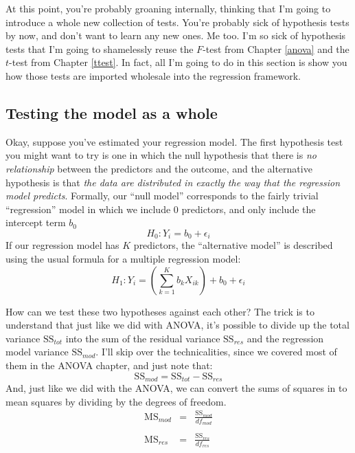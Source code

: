 \documentclass[
]{book}
\begin{document}
At this point, you're probably groaning internally, thinking that I'm going to introduce a whole new collection of tests. You're probably sick of hypothesis tests by now, and don't want to learn any new ones. Me too. I'm so sick of hypothesis tests that I'm going to shamelessly reuse the \(F\)-test from Chapter \ref{anova} and the \(t\)-test from Chapter \ref{ttest}. In fact, all I'm going to do in this section is show you how those tests are imported wholesale into the regression framework.

\hypertarget{testing-the-model-as-a-whole}{%
\subsection{Testing the model as a whole}\label{testing-the-model-as-a-whole}}

Okay, suppose you've estimated your regression model. The first hypothesis test you might want to try is one in which the null hypothesis that there is \emph{no relationship} between the predictors and the outcome, and the alternative hypothesis is that \emph{the data are distributed in exactly the way that the regression model predicts}. Formally, our ``null model'' corresponds to the fairly trivial ``regression'' model in which we include 0 predictors, and only include the intercept term \(b_0\)
\[
H_0: Y_i = b_0 + \epsilon_i
\]
If our regression model has \(K\) predictors, the ``alternative model'' is described using the usual formula for a multiple regression model:
\[
H_1: Y_i = \left( \sum_{k=1}^K b_{k} X_{ik} \right) + b_0 + \epsilon_i
\]

How can we test these two hypotheses against each other? The trick is to understand that just like we did with ANOVA, it's possible to divide up the total variance \(\mbox{SS}_{tot}\) into the sum of the residual variance \(\mbox{SS}_{res}\) and the regression model variance \(\mbox{SS}_{mod}\). I'll skip over the technicalities, since we covered most of them in the ANOVA chapter, and just note that:
\[
\mbox{SS}_{mod} = \mbox{SS}_{tot} - \mbox{SS}_{res}
\]
And, just like we did with the ANOVA, we can convert the sums of squares in to mean squares by dividing by the degrees of freedom.
\[
\begin{array}{rcl}
\mbox{MS}_{mod} &=& \displaystyle\frac{\mbox{SS}_{mod} }{df_{mod}} \\ \\
\mbox{MS}_{res} &=& \displaystyle\frac{\mbox{SS}_{res} }{df_{res} }
\end{array}
\]
\end{document}

